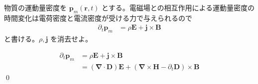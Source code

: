 \documentclass[uplatex,dvipdfmx,a4paper,11pt]{jlreq}
\makeatletter
\newcommand{\EE}{\bm{E}}
\newcommand{\DD}{\bm{D}}
\newcommand{\BB}{\bm{B}}
\newcommand{\HH}{\bm{H}}
\newcommand{\rr}{\bm{r}}
\newcommand{\pp}{\bm{p}}
\newcommand{\vnabla}{\mathbf{\nabla}}
\theoremstyle{definition}
\renewenvironment{proof}[1][\proofname]{\par
  \normalfont
  \topsep6\p@\@plus6\p@ \trivlist
  \item[\hskip\labelsep{\bfseries #1}\@addpunct{\bfseries}]\ignorespaces\quad\par
}{%
  \qed\endtrivlist\@endpefalse
}
\renewcommand\proofname{証明}
\makeatother
\begin{document}
\begin{problem}
物質の運動量密度を $\bm{p}_m(\rr, t)$ とする。電磁場との相互作用による運動量密度の時間変化は電荷密度と電流密度が受ける力で与えられるので
\begin{align}
  \partial_t \pp_m & = \rho\EE + \bm{j}\times\BB
\end{align}
と書ける。$\rho, \bm{j}$ を消去せよ。
\end{problem}
\begin{proof}
  \begin{align}
    \partial_t \pp_m & = \rho\EE + \bm{j}\times\BB                                          \\
                     & = (\vnabla\cdot\DD)\EE + (\vnabla\times\HH - \partial_t\DD)\times\BB
  \end{align}
\end{proof}
\end{document}
